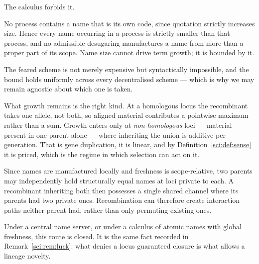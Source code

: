 The calculus forbids it.

\begin{proposition}
\label{sci:prop:namegrowth}
No process contains a name that is its own code, since quotation strictly increases size. Hence every
name occurring in a process is strictly smaller than that process, and no admissible desugaring
manufactures a name from more than a proper part of its scope. Name size cannot drive term growth; it
is bounded by it.
\end{proposition}

The feared scheme is not merely expensive but syntactically impossible, and the bound holds uniformly
across every decentralised scheme --- which is why we may remain agnostic about which one is taken.

What growth remains is the right kind. At a homologous locus the recombinant takes one allele, not
both, so aligned material contributes a pointwise maximum rather than a sum. Growth enters only at
\emph{non-homologous} loci --- material present in one parent alone --- where inheriting the union is
additive per generation. That is gene duplication, it is linear, and by
Definition~\ref{sci:def:sense} it is priced, which is the regime in which selection can act on it.

\begin{proposition}
\label{sci:prop:accidental}
Since names are manufactured locally and freshness is scope-relative, two parents may independently
hold structurally equal names at loci private to each. A recombinant inheriting both then possesses a
single shared channel where its parents had two private ones. Recombination can therefore create
interaction paths neither parent had, rather than only permuting existing ones.
\end{proposition}

Under a central name server, or under a calculus of atomic names with global freshness, this route is
closed. It is the same fact recorded in Remark~\ref{sci:rem:luck}: what denies a locus guaranteed closure
is what allows a lineage novelty.

